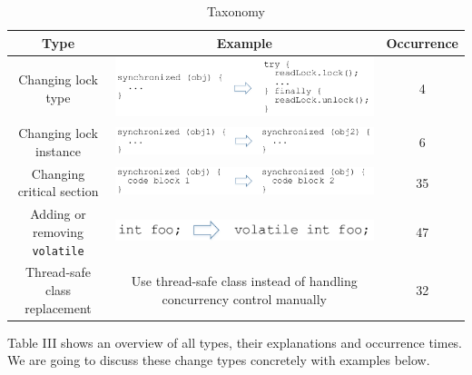 \begin{table}
	\centering
	\caption{Taxonomy}
	\begin{tabular}{|c|c|c|}\hline
		Type&Example&Occurrence\\\hline
		Changing lock type&\includegraphics[scale=0.35]{pattern1}&4\\\hline
		Changing lock instance&\includegraphics[scale=0.35]{pattern2}&6\\\hline
		Changing critical section&\includegraphics[scale=0.35]{pattern3}&35\\\hline
		Adding or removing \texttt{volatile}&\includegraphics[scale=0.35]{pattern4}&47\\\hline
		Thread-safe class replacement&Use thread-safe class instead of handling concurrency control manually&32\\\hline
	\end{tabular}
\end{table}


Table III shows an overview of all types, their explanations and occurrence times. We are going to discuss these change types concretely with examples below.

